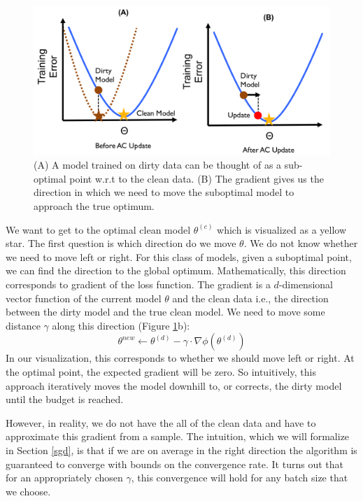 \begin{figure}[ht!]
\centering
 \includegraphics[width=0.8\columnwidth]{figs/update-arch2.png}
 \caption{(A) A model trained on dirty data can be thought of as a sub-optimal point w.r.t to the clean data. (B) The gradient gives us the direction in which we need to move the suboptimal model to approach the true optimum. \label{update-arch2}}
\end{figure}

We want to get to the optimal clean model $\theta^{(c)}$ which is visualized as a yellow star.
The first question is which direction do we move $\theta$.
We do not know whether we need to move left or right.
For this class of models, given a suboptimal point, we can find the direction to 
the global optimum.
Mathematically, this direction corresponds to gradient of the loss function.
The gradient is a $d$-dimensional vector function of the current model $\theta$ and the clean data i.e., the direction between the dirty model and the true clean model.
We need to move some distance $\gamma$ along this direction (Figure \ref{update-arch2}b):
\[
\theta^{new} \leftarrow \theta^{(d)} - \gamma \cdot \nabla\phi(\theta^{(d)})
\]
In our visualization, this corresponds to whether we should move left or right.
At the optimal point, the expected gradient will be zero.
So intuitively, this approach iteratively moves the model downhill to, or corrects, the dirty model until the budget is reached.

However, in reality, we do not have the all of the clean data and have to approximate this gradient from a sample.
The intuition, which we will formalize in Section \ref{sgd}, is that if we are on average in the right direction the algorithm is guaranteed to converge with bounds on the convergence rate.
It turns out that for an appropriately chosen $\gamma$, this convergence will hold for any batch size that we choose.

